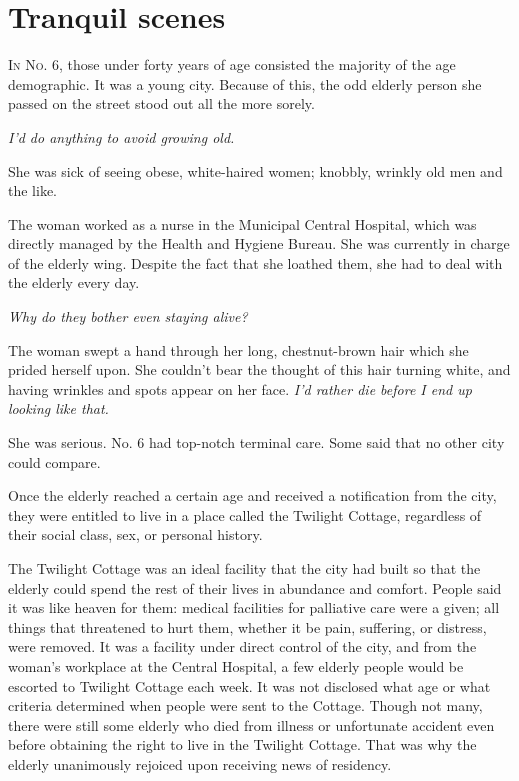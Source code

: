 
\chapter{Tranquil scenes}


\lettrine{I}{n No. 6}, those under forty years of age consisted the majority of the
age demographic. It was a young city. Because of this, the odd elderly
person she passed on the street stood out all the more sorely.

\emph{I'd do anything to avoid growing old.}

She was sick of seeing obese, white-haired women; knobbly, wrinkly old
men and the like.~

The woman worked as a nurse in the Municipal Central Hospital, which was
directly managed by the Health and Hygiene Bureau. She was currently in
charge of the elderly wing. Despite the fact that she loathed them, she
had to deal with the elderly every day.

\emph{Why do they bother even staying alive?}

The woman swept a hand through her long, chestnut-brown hair which she
prided herself upon. She couldn't bear the thought of this hair turning
white, and having wrinkles and spots appear on her face. \emph{I'd rather die
before I end up looking like that.}

She was serious. No. 6 had top-notch terminal care. Some said that no
other city could compare.

Once the elderly reached a certain age and received a notification from
the city, they were entitled to live in a place called the Twilight
Cottage, regardless of their social class, sex, or personal history.

The Twilight Cottage was an ideal facility that the city had built so
that the elderly could spend the rest of their lives in abundance and
comfort. People said it was like heaven for them: medical facilities for
palliative care were a given; all things that threatened to hurt them,
whether it be pain, suffering, or distress, were removed. It was a
facility under direct control of the city, and from the woman's
workplace at the Central Hospital, a few elderly people would be
escorted to Twilight Cottage each week. It was not disclosed what age or
what criteria determined when people were sent to the Cottage. Though
not many, there were still some elderly who died from illness or
unfortunate accident even before obtaining the right to live in the
Twilight Cottage. That was why the elderly unanimously rejoiced upon
receiving news of residency.

